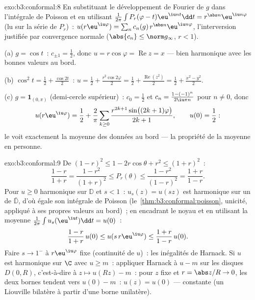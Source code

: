 \begin{solution}{exo:b3:conformal:8}
En substituant le développement de Fourier de $g$ dans
l'intégrale de Poisson et en utilisant
$\frac1{2\pi}\int P_r(\varphi - t)\eu^{\iu nt}\dd t =
r^{\abs n}\eu^{\iu n\varphi}$ (lu sur la série de $P_r$)~:
$u(r\eu^{\iu\varphi}) = \sum_nc_n(g)\,r^{\abs
n}\eu^{\iu n\varphi}$, l'interversion justifiée par
convergence normale ($\abs{c_n} \leq \norm g_\infty$, $r <
1$).

(a) $g = \cos t$~: $c_{\pm1} = \frac12$, donc $u =
r\cos\varphi = \operatorname{Re}z = x$ --- bien harmonique
avec les bonnes valeurs au bord.

(b) $\cos^2t = \frac12 + \frac{\cos 2t}2$~: $u = \frac12 +
\frac{r^2\cos2\varphi}2 = \frac12 +
\frac{\operatorname{Re}(z^2)}2 = \frac12 + \frac{x^2 -
y^2}{2}$.

(c) $g = \mathbf 1_{(0,\pi)}$ (demi-cercle supérieur)~: $c_0
= \frac12$ et $c_n = \frac{1 - (-1)^n}{2\iu\pi n}$ pour $n
\neq 0$, donc
\[
u(r\eu^{\iu\varphi}) = \frac12 + \frac2\pi\sum_{k\geq0}
\frac{r^{2k+1}\sin\bigl((2k+1)\varphi\bigr)}{2k + 1},
\qquad u(0) = \frac12 :
\]
le  voit exactement la moyenne des données au bord ---
la propriété de la moyenne en personne.
\end{solution}

\begin{solution}{exo:b3:conformal:9}
De $(1-r)^2 \leq 1 - 2r\cos\theta + r^2 \leq (1+r)^2$~:
\[
\frac{1-r}{1+r} = \frac{1 - r^2}{(1+r)^2} \leq P_r(\theta)
\leq \frac{1 - r^2}{(1 - r)^2} = \frac{1+r}{1-r} .
\]
Pour $u \geq 0$ harmonique sur $\mathbb D$ et $s < 1$~:
$u_s(z) = u(sz)$ est harmonique sur un  de
$\bar{\mathbb D}$, d'où égale son intégrale de Poisson
(le~\cref{thm:b3:conformal:poisson}, unicité, appliqué à ses
propres valeurs au bord)~; en encadrant le noyau et en
utilisant la moyenne $\frac1{2\pi}\int u_s(\eu^{\iu t})\dd t
= u(0)$~:
\[
\frac{1-r}{1+r}\,u(0) \leq u(s\,r\eu^{\iu\varphi}) \leq
\frac{1+r}{1-r}\,u(0).
\]
Faire $s \to 1^-$ à $r\eu^{\iu\varphi}$ fixe (continuité de
$u$)~: les inégalités de Harnack. Si $u$ est harmonique sur
$\C$ avec $u \geq m$~: appliquer Harnack à $u - m$ sur les
disques $D(0, R)$, c'est-à-dire à $z \mapsto u(Rz) - m$~:
pour $z$ fixe et $r = \abs z/R \to 0$, les deux bornes
tendent vers $u(0) - m$~: $u(z) = u(0)$ --- constante (un
Liouville bilatère à partir d'une borne unilatère).
\end{solution}

